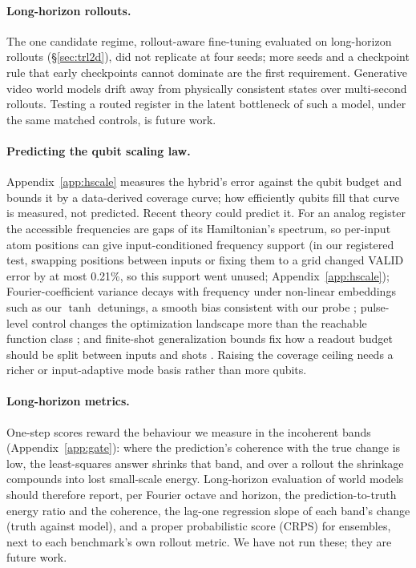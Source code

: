 \documentclass{article}
\begin{document}
\paragraph{Long-horizon rollouts.} The one candidate regime, rollout-aware fine-tuning evaluated on
long-horizon rollouts (\S\ref{sec:trl2d}), did not replicate at four seeds; more seeds and a checkpoint rule that early
checkpoints cannot dominate are the first requirement. Generative video world models drift away from physically
consistent states over multi-second rollouts. Testing a routed register in the latent bottleneck of such a model, under
the same matched controls, is future work.

\paragraph{Predicting the qubit scaling law.} Appendix~\ref{app:hscale} measures the hybrid's error against the qubit
budget and bounds it by a data-derived coverage curve; how efficiently qubits fill that curve is measured, not
predicted. Recent theory could predict it. For an analog register the accessible frequencies are gaps of its
Hamiltonian's spectrum, so per-input atom positions can give input-conditioned frequency support \citep{wang2026qsm} (in our registered test,
swapping positions between inputs or fixing them to a grid changed VALID error by at most 0.21\%, so this support went
unused; Appendix~\ref{app:hscale});
Fourier-coefficient variance decays with frequency under non-linear embeddings such as our $\tanh$ detunings, a smooth
bias consistent with our probe \citep{kang2026fourier}; pulse-level control changes the optimization landscape more than
the reachable function class \citep{strobl2026pulse}; and finite-shot generalization bounds fix how a readout budget
should be split between inputs and shots \citep{catak2026budget}. Raising the coverage ceiling needs a richer or
input-adaptive mode basis rather than more qubits.

\paragraph{Long-horizon metrics.} One-step scores reward the behaviour we measure in the incoherent bands
(Appendix~\ref{app:gate}): where the prediction's coherence with the true change is low, the least-squares answer shrinks
that band, and over a rollout the shrinkage compounds into lost small-scale energy. Long-horizon evaluation of world
models should therefore report, per Fourier octave and horizon, the prediction-to-truth energy ratio and the coherence,
the lag-one regression slope of each band's change (truth against model), and a proper probabilistic score (CRPS) for ensembles, next
to each benchmark's own rollout metric. We have not run these; they are future work.
\end{document}

